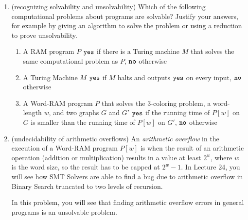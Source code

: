 \documentclass[11pt]{article}
\begin{document}
\begin{enumerate}
\item (recognizing solvability and unsolvability) 
Which of the following computational problems about programs are solvable?  Justify your answers, for example by giving an algorithm to solve the problem or using a reduction to prove unsolvability.
\begin{enumerate}
\item
{}
{A RAM program $P$}
{$\texttt{yes}$ if there is a Turing machine $M$ that solves the same computational problem as $P$, $\texttt{no}$ otherwise}

    \item 
{A Turing Machine $M$}
{$\texttt{yes}$ if $M$ halts and outputs $\texttt{yes}$ on every input, $\texttt{no}$ otherwise}   

\item 
{}
{A Word-RAM program $P$ that solves the 3-coloring problem, a word-length $w$, and two graphs $G$ and $G'$}
{$\texttt{yes}$ if the running time of $P[w]$ on $G$ is smaller than the running time of $P[w]$ on $G'$, $\texttt{no}$ otherwise}    

    
    
\end{enumerate}


  \item (undecidability of arithmetic overflows)
  An {\em arithmetic overflow} in the execution of a Word-RAM program $P[w]$ is when the result of an arithmetic operation (addition or multiplication) results in a value at least $2^w$, where $w$ is the word size, so the result has to be capped at $2^w-1$. 
  In Lecture 24, you will see how SMT Solvers are able to find a bug due to arithmetic overflow in Binary Search truncated to two levels of recursion. 

  
  In this problem, you will see that finding arithmetic overflow errors in general programs is an unsolvable problem.


\end{enumerate}
\end{document}
